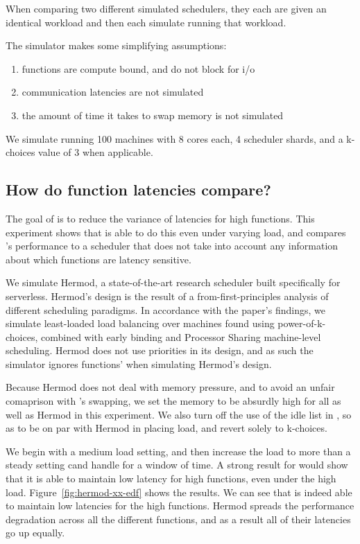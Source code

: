 When comparing two different simulated schedulers, they each are given an
identical workload and then each simulate running that workload.

The simulator makes some simplifying assumptions:
\begin{enumerate}
    \item functions are compute bound, and do not block for i/o
    \item communication latencies are not simulated
    \item the amount of time it takes to swap memory is not simulated
\end{enumerate}

We simulate running 100 machines with 8 cores each, 4 scheduler shards, and a
k-choices value of 3 when applicable.

\subsection{How do function latencies compare?}

The goal of \sys{} is to reduce the variance of latencies for high \priceclass{}
functions. This experiment shows that \sys{} is able to do this even under
varying load, and compares \sys{}'s performance to a scheduler that does not
take into account any information about which functions are latency sensitive.

We simulate Hermod\cite{hermod}, a state-of-the-art research scheduler built
specifically for serverless. Hermod's design is the result of a
from-first-principles analysis of different scheduling paradigms. In accordance
with the paper's findings, we simulate least-loaded load balancing over machines
found using power-of-k-choices, combined with early binding and Processor
Sharing machine-level scheduling. Hermod does not use priorities in its design,
and as such the simulator ignores functions' \class{} when simulating Hermod's
design.

Because Hermod does not deal with memory pressure, and to avoid an unfair
comaprison with \sys{}'s swapping, we set the memory to be absurdly high for all
\sys{} as well as Hermod in this experiment. We also turn off the use of the
idle list in \sys{}, so as to be on par with Hermod in placing load, and revert
solely to k-choices.

We begin with a medium load setting, and then increase the load to more than a
steady setting cand handle for a window of time. A strong result for \sys{}
would show that it is able to maintain low latency for high \priceclass{}
functions, even under the high load. Figure~\ref{fig:hermod-xx-edf} shows the
results. We can see that \sys{} is indeed able to maintain low latencies for the
high \class{} functions. Hermod spreads the performance degradation across all
the different functions, and as a result all of their latencies go up equally.


